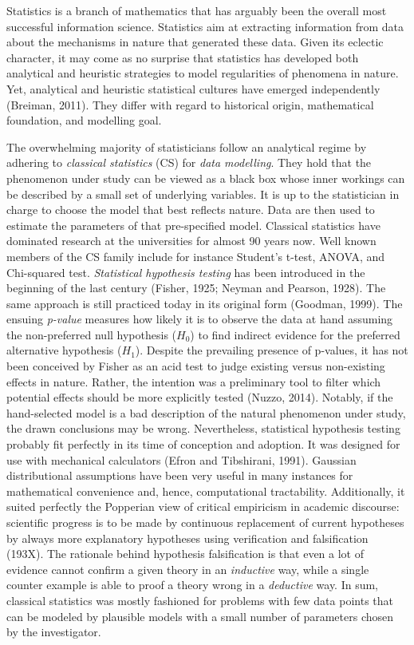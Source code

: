 \documentclass[authoryear,review,3p]{elsarticle}
\begin{document}
Statistics is a branch of mathematics that has arguably been the
overall most successful information science.
Statistics aim at extracting information from data
about the mechanisms in nature that generated these data.
%
Given its eclectic character, it may come as no surprise that statistics
has developed both analytical and heuristic strategies
to model regularities of phenomena in nature.
Yet, analytical and heuristic statistical cultures
have emerged independently (Breiman, 2011).
They differ with regard to historical origin, mathematical foundation,
and modelling goal.

The overwhelming majority of statisticians
follow an analytical regime by
adhering to \textit{classical statistics} (CS) for
\textit{data modelling}.
They hold that the phenomenon under study can be viewed as a black box
whose inner workings can be described by a small set of
underlying variables.
It is up to the statistician in charge
to choose the model that best reflects nature.
Data are then used to estimate the parameters of that pre-specified model.
Classical statistics have dominated research at the universities
for almost 90 years now.
%
Well known members of the CS family include for instance
Student's t-test, ANOVA,
and Chi-squared test.
\textit{Statistical hypothesis testing} has been introduced in the beginning
of the last century (Fisher, 1925; Neyman and Pearson, 1928).
The same approach is still practiced today in its original form (Goodman, 1999).  
%
The ensuing \textit{p-value} measures how likely it is
to observe the data at hand
assuming the non-preferred null hypothesis ($H_0$)
to find indirect evidence
for the preferred alternative hypothesis ($H_1$).
%
Despite the prevailing presence of p-values,
it has not been conceived by Fisher as an acid test
to judge existing versus non-existing effects in nature.
Rather, the intention was a preliminary tool to
filter which potential effects should be more explicitly tested (Nuzzo, 2014).
%
Notably, if the hand-selected model is a bad description of
the natural phenomenon under study,
the drawn conclusions may be wrong.
%
Nevertheless, statistical hypothesis testing probably fit perfectly
in its time of conception and adoption.
It was designed for use with mechanical calculators
(Efron and Tibshirani, 1991). Gaussian distributional assumptions
have been very useful in many instances for
mathematical convenience and, hence, computational tractability.
Additionally, it suited perfectly the Popperian view of
critical empiricism in academic discourse:
scientific progress is to be made by continuous replacement of current
hypotheses by always more explanatory hypotheses
using verification and falsification (193X).
The rationale behind hypothesis falsification
is that even a lot of evidence cannot confirm
a given theory in an \textit{inductive} way, 
while a single counter example is able to proof a theory wrong
in a \textit{deductive} way.
%
In sum,
classical statistics was mostly fashioned
for problems with few data points that can be modeled 
by plausible models with a small number of parameters chosen by the
investigator.
\end{document}
